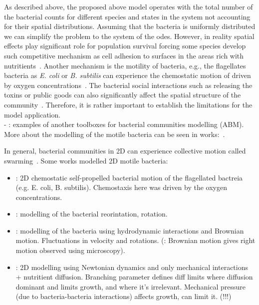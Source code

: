 \documentclass[10pt,A4paper]{article}
\begin{document}
As described above, the proposed above model operates with the total number of the bacterial counts for different species and states in the system not accounting for their spatial distributions.
Assuming that the bacteria is uniformly distributed we can simplify the problem to the system of the \acp{ode}.
However, in reality spatial effects play significant role for population survival forcing some species develop such competitive mechanism as cell adhesion to surfaces in the areas rich with nutritients~\cite{htuson_bacteriasurface_2013}.
Another mechanism is the motility of bacteria, e.g., the flagellates bacteria as \textit{E. coli} or \textit{B. subtilis} can experience the chemostatic motion of driven by oxygen concentrations~\cite{decoene_microscopic_2011}.
The bacterial social interactions such as releasing the toxins or public goods can also significantly affect the spatial structure of the community~\cite{blanchard_bacterial_2015}.
Therefore, it is rather important to establish the limitations for the model application.\\

- \cite{gorochowski_bsim_2012, li_nufeb_2019}: examples of another toolboxes for bacterial communities modelling (ABM).\\
More about the modelling of the motile bacteria can be seen in works:~\cite{decoene_microscopic_2011, rosser_modelling_2014, sokolov_physical_2012, li_amplified_2008}.

In general, bacterial communities in 2D can experience collective motion called swarming~\cite{wu_collective_2015}.
Some works modelled 2D motile bacteria:
\begin{itemize}
    \item \cite{decoene_microscopic_2011}: 2D chemostatic self-propelled bacterial motion of the flagellated bactreia (e.g. E. coli, B. subtilis).
    Chemostaxis here was driven by the oxygen concentrations.
    \item \cite{rosser_modelling_2014}: modelling of the bacterial reorintation, rotation.
    \item \cite{sokolov_physical_2012, li_amplified_2008}: modelling of the bacteria using hydrodynamic interactions and Brownian motion.
    Fluctuations in velocity and rotations.
    (\cite{li_amplified_2008}: Brownian motion gives right motion observed using microscopy).
    \item \cite{farrell_mechanically_2013}: 2D modelling using Newtonian dynamics and only mechanical interactions + nutritient diffusion.
    Branching parameter defines diff limits where diffusion dominant and limits growth, and where it's irrelevant.
    Mechanical pressure (due to bacteria-bacteria interactions) affects growth, can limit it. (!!!)
\end{itemize}
\end{document}
